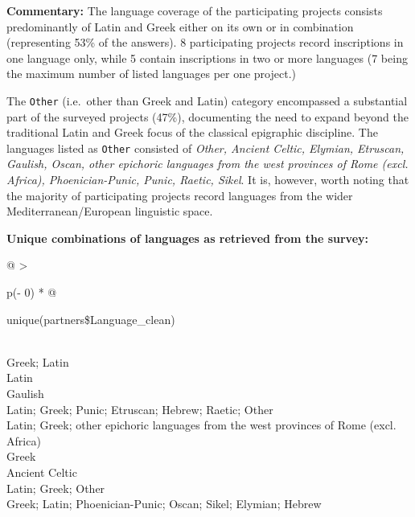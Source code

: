 \documentclass[
  12pt,
]{scrreprt}
\begin{document}
\normalsize

\footnotesize

\normalsize

\textbf{Commentary:} The language coverage of the participating projects
consists predominantly of Latin and Greek either on its own or in
combination (representing 53\% of the answers). 8 participating projects
record inscriptions in one language only, while 5 contain inscriptions
in two or more languages (7 being the maximum number of listed languages
per one project.)

The \texttt{Other} (i.e.~other than Greek and Latin) category
encompassed a substantial part of the surveyed projects (47\%),
documenting the need to expand beyond the traditional Latin and Greek
focus of the classical epigraphic discipline. The languages listed as
\texttt{Other} consisted of \emph{Other, Ancient Celtic, Elymian,
Etruscan, Gaulish, Oscan, other epichoric languages from the west
provinces of Rome (excl. Africa), Phoenician-Punic, Punic, Raetic,
Sikel}. It is, however, worth noting that the majority of participating
projects record languages from the wider Mediterranean/European
linguistic space.

\textbf{Unique combinations of languages as retrieved from the survey:}

\footnotesize

\begin{longtable}[]{@{}
  >{\raggedright\arraybackslash}p{(\columnwidth - 0\tabcolsep) * }@{}}
\toprule
\begin{minipage}[b]{\linewidth}\raggedright
unique(partners\$Language\_clean)
\end{minipage} \\
\midrule
\endhead
Greek; Latin \\
Latin \\
Gaulish \\
Latin; Greek; Punic; Etruscan; Hebrew; Raetic; Other \\
Latin; Greek; other epichoric languages from the west provinces of Rome
(excl. Africa) \\
Greek \\
Ancient Celtic \\
Latin; Greek; Other \\
Greek; Latin; Phoenician-Punic; Oscan; Sikel; Elymian; Hebrew \\
\bottomrule
\end{longtable}

\normalsize
\end{document}
